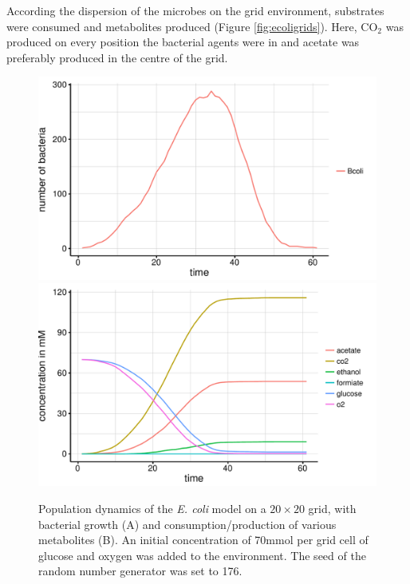 According the dispersion of the microbes on the grid environment, substrates were consumed and metabolites produced (Figure \hyperref[fig:ecoligrids]{\ref{fig:ecoligrids}}). Here, CO$_2$ was produced on every position the bacterial agents were in and  acetate was preferably produced in the centre of the grid.
\begin{figure}[h!]
  \centering
    \includegraphics[scale=0.45]{../results/Bcoli_20x20_seed176_growth.pdf}
    \includegraphics[scale=0.45]{../results/Bcoli_20x20_seed176_subs.pdf}
  \caption{Population dynamics of the \emph{E. coli} model on a $20\times20$ grid, with bacterial growth (A) and consumption/production of various metabolites (B). An initial concentration of 70\;mmol per grid cell of glucose and oxygen was added to the environment. The seed of the random number generator was set to 176.}
  \label{fig:ecolisg}
\end{figure}
